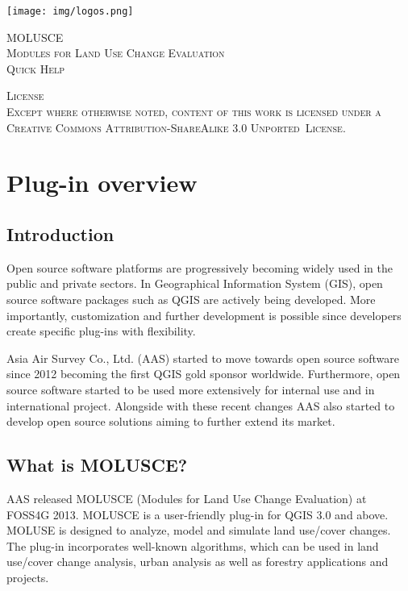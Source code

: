 \documentclass{report}
\begin{document}
\begin{titlepage}


\center %
 
\texttt{[image: img/logos.png]}

\vfill %

\textsc{\LARGE MOLUSCE}\\[1.5cm] 
\textsc{\Large Modules for Land Use Change Evaluation}\\[0.5cm] 
\textsc{\large Quick Help}\\[0.5cm]

\vfill %

 
\textsc{
License\\
Except where otherwise noted, content of this work is licensed under a Creative
Commons Attribution-ShareAlike 3.0 Unported~License.
}

\end{titlepage}


\tableofcontents


\chapter{Plug-in overview}
\section{Introduction}

Open source software platforms are progressively becoming widely used in the public and private
sectors. In Geographical Information System (GIS), open source software packages such as QGIS
are actively being developed. More importantly, customization and further development is possible
since developers create specific plug-ins with flexibility.

Asia Air Survey Co., Ltd. (AAS) started to move towards open source software since 2012
becoming the first QGIS gold sponsor worldwide. Furthermore, open source software started to be
used more extensively for internal use and in international project. Alongside with these recent
changes AAS also started to develop open source solutions aiming to further extend its market.


\section{What is MOLUSCE?}
AAS released MOLUSCE (Modules for Land Use Change Evaluation) at FOSS4G 2013.
MOLUSCE is a user-friendly plug-in for QGIS 3.0 and above. MOLUSE is designed to analyze,
model and simulate land use/cover changes. The plug-in incorporates well-known algorithms,
which can be used in land use/cover change analysis, urban analysis as well as forestry applications
and projects.
\end{document}
